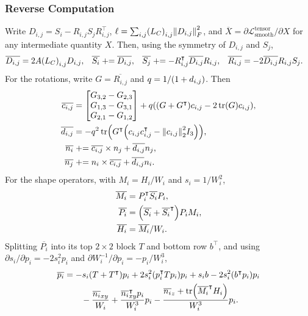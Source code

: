 \subsubsection{Reverse Computation}
Write \(D_{i, j} = S_i - R_{i, j} S_j R_{i, j}^\intercal\), \(\ell = \sum_{i, j} \pof{L_C}_{i, j} \norm{D_{i, j}}_F^2\), and \(\overline{X} = \partial \mathcal{L}_{\mathrm{smooth}}^{\text{tensor}} / \partial X\) for any intermediate quantity \(X\). Then, using the symmetry of \(D_{i, j}\) and \(S_j\), \begin{align*}
	\overline{D_{i, j}} &= 2 A \pof{L_C}_{i, j} D_{i, j}, &
	\overline{S_i} &\mathrel{+}= \overline{D_{i, j}}, &
	\overline{S_j} &\mathrel{+}= -R_{i, j}^\intercal \overline{D_{i, j}} R_{i, j}, &
	\overline{R_{i, j}} &= -2 \overline{D_{i, j}} R_{i, j} S_j.
\end{align*}
For the rotations, write \(G = \overline{R_{i, j}}\) and \(q = 1 / \pof{1 + d_{i, j}}\). Then \begin{align*}
	\overline{c_{i, j}} &= \begin{bmatrix} G_{3, 2} - G_{2, 3} \\ G_{1, 3} - G_{3, 1} \\ G_{2, 1} - G_{1, 2} \end{bmatrix} + q \pof{\pof{G + G^\intercal} c_{i, j} - 2 \operatorname{tr}\pof{G} c_{i, j}}, \\
	\overline{d_{i, j}} &= -q^2 \operatorname{tr}\pof{G^\intercal \pof{c_{i, j} c_{i, j}^\intercal - \norm{c_{i, j}}_2^2 I_3}}, \\
	\overline{n_i} &\mathrel{+}= \overline{c_{i, j}} \times n_j + \overline{d_{i, j}} n_j, \\
	\overline{n_j} &\mathrel{+}= n_i \times \overline{c_{i, j}} + \overline{d_{i, j}} n_i.
\end{align*}
For the shape operators, with \(M_i = H_i / W_i\) and \(s_i = 1 / W_i^2\), \begin{align*}
	\overline{M_i} &= P_i^\intercal \overline{S_i} P_i, \\
	\overline{P_i} &= \pof{\overline{S_i} + \overline{S_i}^\intercal} P_i M_i, \\
	\overline{H_i} &= \overline{M_i} / W_i.
\end{align*}
Splitting \(\overline{P_i}\) into its top \(2 \times 2\) block \(T\) and bottom row \(b^\intercal\), and using \(\partial s_i / \partial p_i = -2 s_i^2 p_i\) and \(\partial W_i^{-1} / \partial p_i = -p_i / W_i^3\), \begin{align*}
	\overline{p_i} &= -s_i \pof{T + T^\intercal} p_i + 2 s_i^2 \pof{p_i^\intercal T p_i} p_i + s_i b - 2 s_i^2 \pof{b^\intercal p_i} p_i \\
		&\qquad- \frac{\overline{n_i}_{xy}}{W_i} + \frac{\overline{n_i}_{xy}^\intercal p_i}{W_i^3} p_i - \frac{\overline{n_i}_z + \operatorname{tr}\pof{\overline{M_i}^\intercal H_i}}{W_i^3} p_i.
\end{align*}
